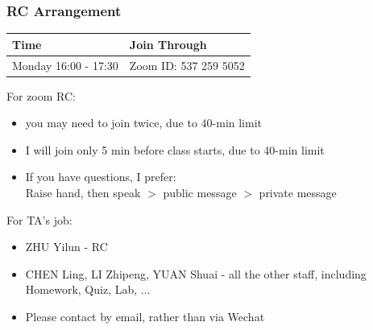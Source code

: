 \documentclass{beamer}
\begin{document}
\begin{frame}
\frametitle{RC Arrangement}
\begin{table}
\begin{tabular}{ l l}
\toprule
\textbf{Time} & \textbf{Join Through}\\
\midrule
Monday 16:00 - 17:30 & Zoom ID: 537 259 5052 \\
\bottomrule
\end{tabular}
\end{table}

For zoom RC:
\begin{itemize}
    \item you may need to join twice, due to 40-min limit
    \item I will join only 5 min before class starts, due to 40-min limit
    \item If you have questions, I prefer: \\
    Raise hand, then speak $>$ public message $>$ private message 
\end{itemize}

For TA's job:
\begin{itemize}
    \item ZHU Yilun - RC 
    \item CHEN Ling, LI Zhipeng, YUAN Shuai - all the other staff, including Homework, Quiz, Lab, ...
    \item Please contact by email, rather than via Wechat
\end{itemize}

\end{frame}
\end{document}
